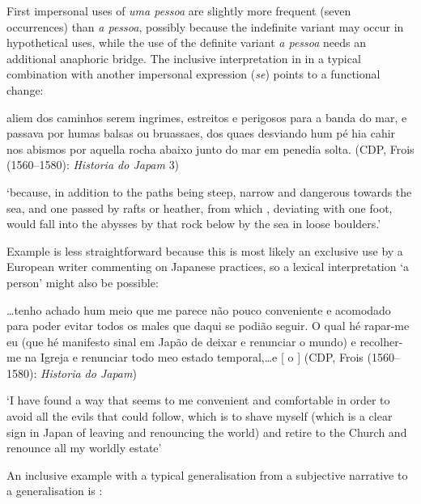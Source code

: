 \documentclass[output=paper]{langscibook}
\begin{document}
{First impersonal uses of} {\textit{uma pessoa}} {are slightly more frequent (seven occurrences) than} {\textit{a pessoa}}{, possibly because the indefinite variant may occur in hypothetical uses, while the use of the definite variant} {\textit{a pessoa}} {needs an additional anaphoric bridge. The inclusive interpretation in  in a typical combination with another impersonal expression (}{\textit{se}}{) points to a functional change:}



\eanoraggedright\label{ex:amaral:24}
\begin{otherlanguage}{portuguese}
aliem dos caminhos serem ingrimes, estreitos e perigosos para a banda do mar, e  passava por humas balsas ou bruassaes, dos quaes desviando hum pé hia  cahir nos abismos por aquella rocha abaixo junto do mar em penedia solta. {(CDP, Frois (1560–1580):} {\textit{Historia do Japam}} {3)}
\end{otherlanguage}
\glt ‘because, in addition to the paths being steep, narrow and dangerous towards the sea, and one passed by rafts or heather, from which , deviating with one foot, would fall into the abysses by that rock below by the sea in loose boulders.’
\z 


Example  is less straightforward because this is  most likely an exclusive use by a European writer commenting on Japanese practices, so a lexical interpretation ‘a person’ might also be possible:


\eanoraggedright\label{ex:amaral:25}
\begin{otherlanguage}{portuguese}
…tenho achado hum meio que me parece não pouco conveniente e acomodado para poder evitar todos os males que daqui se podião seguir. O qual hé rapar-me eu (que hé manifesto sinal em Japão de  deixar e renunciar o mundo) e recolher-me na Igreja e renunciar todo meo estado temporal,…e [ o ] (CDP, Frois (1560–1580): \textit{Historia do Japam})
\end{otherlanguage}
\glt ‘I have found a way that seems to me convenient and comfortable in order to avoid all the evils that could follow, which is to shave myself (which is a clear sign in Japan of {  }{leaving and renouncing the world)  and retire to the Church and renounce all my worldly estate’}
\z 


An inclusive example with a typical generalisation from a subjective narrative to a generalisation is :
\end{document}
